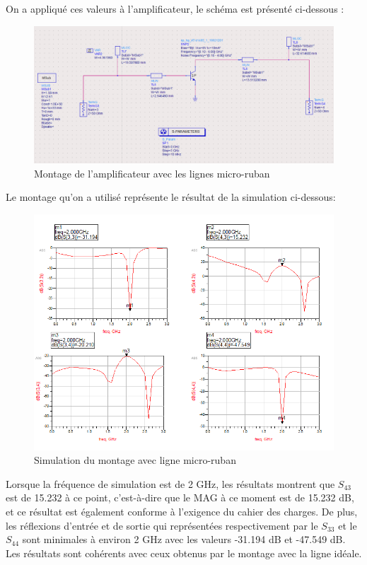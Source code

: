 \documentclass[french]{article}
\begin{document}
On a appliqué ces valeurs à l'amplificateur, le schéma est présenté ci-dessous :
\begin{figure}[H]
	\centering
	\includegraphics[width=1.0\linewidth]{../5SynthAmp/ligne_micro_ruban}
	\caption{Montage de l’amplificateur avec les lignes micro-ruban}
	\label{fig:ligne_micro_ruban}
\end{figure}

Le montage qu’on a utilisé représente le résultat de la simulation ci-dessous:
\begin{figure}[H]
	\centering
	\includegraphics[width=1\linewidth]{../5SynthAmp/ligne_micro_ruban_Sparametres}
	\caption{Simulation du montage avec ligne micro-ruban}
	\label{fig:ligne_micro_ruban_Sparametres}
\end{figure}

Lorsque la fréquence de simulation est de 2 GHz, les résultats montrent que $S_{43}$ est de 15.232 à ce point, c'est-à-dire que le MAG à ce moment est de 15.232 dB, et ce résultat est également conforme à l'exigence du cahier des charges. De plus, les réflexions d’entrée et de sortie qui représentées respectivement par le $S_{33}$ et le $S_{44}$ sont minimales à environ 2 GHz avec les valeurs -31.194 dB et -47.549 dB. Les résultats sont cohérents avec ceux obtenus par le montage avec la ligne idéale.
\end{document}
